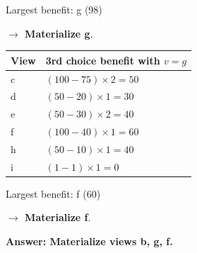 \documentclass{article}
\begin{document}
Largest benefit: g (98)

\textbf{$\to$ Materialize g}.

\begin{tabular}{l|l}
    View & 3rd choice benefit with $v=g$ \\
    \hline
    c    & $ (100-75)\times 2 = 50 $     \\
    d    & $ (50-20)\times 1 = 30 $      \\
    e    & $ (50-30)\times 2 = 40 $      \\
    f    & $ (100-40)\times 1 = 60 $     \\
    h    & $ (50-10)\times 1 = 40 $      \\
    i    & $ (1-1)\times 1 = 0 $         \\
\end{tabular}

Largest benefit: f (60)

\textbf{$\to$ Materialize f}.

\textbf{Answer: Materialize views b, g, f.}
\end{document}
